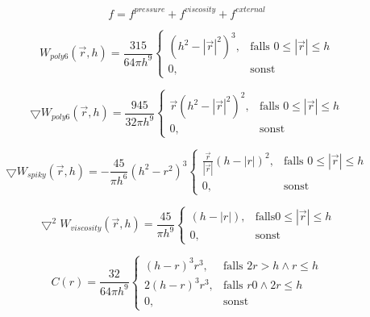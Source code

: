 \documentclass[a4paper]{paper}
\begin{document}
\begin{equation}
\label{force}
f = f^{pressure} + f^{viscosity} + f^{external}
\end{equation}

\begin{equation}
	\label{poly6}
	W_{poly6}(\vec{r},h) = \frac{315}{64 \pi h^9} 
	\begin{cases}
		(h^2-|\vec{r}|^2)^3, & \text{falls } 0 \leq |\vec{r}| \leq h \\
		0, & \text{sonst}
	\end{cases}
\end{equation}

\begin{equation}
	\label{gradient_poly6}
	\bigtriangledown W_{poly6}(\vec{r},h) = \frac{945}{32 \pi h^9} 
	\begin{cases}
		\vec{r}(h^2-|\vec{r}|^2)^2, &\text{falls } 0 \leq |\vec{r}| \leq h  \\
		0, & \text{sonst}
	\end{cases}
\end{equation}

\begin{equation}
	\label{spiky}
	\bigtriangledown W_{spiky}(\vec{r},h) = -\frac{45}{\pi h^6} (h^2-r^2)^3
	\begin{cases}
		\frac{\vec{r}}{|\vec{r}|}(h-|r|)^2, & \text{falls } 0 \leq |\vec{r}| \leq h\\
		0, & \text{sonst}
	\end{cases}
\end{equation}

\begin{equation}
	\label{viscosity}
	\bigtriangledown^2 W_{viscosity}(\vec{r},h) = \frac{45}{\pi h^9} 
	\begin{cases}
		(h-|r|),& \text{falls} 0 \leq |\vec{r}| \leq h \\
		0, & \text{sonst}
	\end{cases}
\end{equation}

\begin{equation}
	\label{surface}
	C(r) = \frac{32}{64 \pi h^9}
	\begin{cases}
		(h-r)^3r^3,  &\text{falls }  2r > h \land r \leq h\\
		2(h-r)^3r^3, &\text{falls } r  0 \land 2r \leq h\\
		0,&\text{sonst}  
	\end{cases}
\end{equation}
\end{document}
